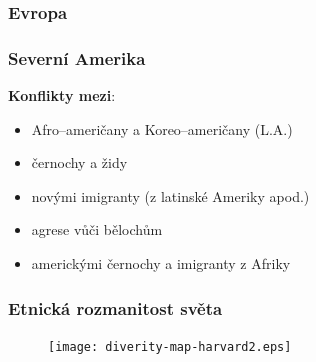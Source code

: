 \documentclass{beamer}
\begin{document}
\begin{frame}
\transwipe
{}
\frametitle{Evropa}
\end{frame}

\begin{frame}
\transwipe
{}
\frametitle{Severní Amerika}

\textbf{Konflikty mezi}:

\begin{itemize}
\item Afro--američany a Koreo--američany (L.A.)
\item černochy a židy
\item novými imigranty (z latinské Ameriky apod.)
\item agrese vůči bělochům
\item americkými černochy a imigranty z Afriky
\end{itemize}
\end{frame}

\begin{frame}
\transwipe
{}
\frametitle{Etnická rozmanitost světa}
\begin{figure}[h]
\centering
\texttt{[image: diverity-map-harvard2.eps]}
\end{figure}
\end{frame}
\end{document}
